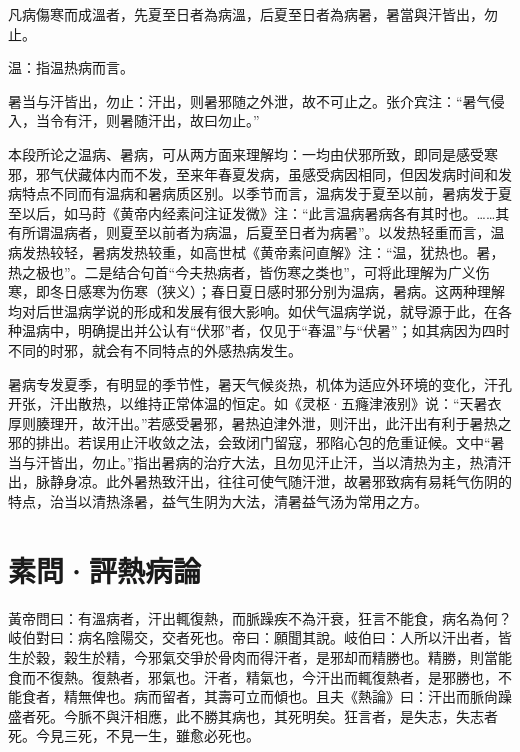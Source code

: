 \documentclass[draft,12pt]{ctexbook}
\begin{document}

\begin{yuanwen}
凡病傷寒而成溫者，先夏至日者為病溫，后夏至日者為病暑，暑當與汗皆出，勿止。
\end{yuanwen}


\begin{jiaozhu}
  \item 温：指温热病而言。
  \item 暑当与汗皆出，勿止：汗出，则暑邪随之外泄，故不可止之。张介宾注：“暑气侵入，当令有汗，则暑随汗出，故曰勿止。”
\end{jiaozhu}


本段所论之温病、暑病，可从两方面来理解均：一均由伏邪所致，即同是感受寒邪，邪气伏藏体内而不发，至来年春夏发病，虽感受病因相同，但因发病时间和发病特点不同而有温病和暑病质区别。以季节而言，温病发于夏至以前，暑病发于夏至以后，如马莳《黄帝内经素问注证发微》注：“此言温病暑病各有其时也。……其有所谓温病者，则夏至以前者为病温，后夏至日者为病暑”。以发热轻重而言，温病发热较轻，暑病发热较重，如高世栻《黄帝素问直解》注：“温，犹热也。暑，热之极也”。二是结合句首“今夫热病者，皆伤寒之类也”，可将此理解为广义伤寒，即冬日感寒为伤寒（狭义）；春日夏日感时邪分别为温病，暑病。这两种理解均对后世温病学说的形成和发展有很大影响。如伏气温病学说，就导源于此，在各种温病中，明确提出并公认有“伏邪”者，仅见于“春温”与“伏暑”；如其病因为四时不同的时邪，就会有不同特点的外感热病发生。



暑病专发夏季，有明显的季节性，暑天气候炎热，机体为适应外环境的变化，汗孔开张，汗出散热，以维持正常体温的恒定。如《灵枢·五癃津液别》说：“天暑衣厚则腠理开，故汗出。”若感受暑邪，暑热迫津外泄，则汗出，此汗出有利于暑热之邪的排出。若误用止汗收敛之法，会致闭门留寇，邪陷心包的危重证候。文中“暑当与汗皆出，勿止。”指出暑病的治疗大法，且勿见汗止汗，当以清热为主，热清汗出，脉静身凉。此外暑热致汗出，往往可使气随汗泄，故暑邪致病有易耗气伤阴的特点，治当以清热涤暑，益气生阴为大法，清暑益气汤为常用之方。

\section{素問·評熱病論}%


\begin{yuanwen}
黃帝問曰：有溫病者，汗出輒復熱，而脈躁疾不為汗衰，狂言不能食，病名為何？岐伯對曰：病名陰陽交，交者死也。帝曰：願聞其說。岐伯曰：人所以汗出者，皆生於穀，榖生於精，今邪氣交爭於骨肉而得汗者，是邪却而精勝也。精勝，則當能食而不復熱。復熱者，邪氣也。汗者，精氣也，今汗出而輒復熱者，是邪勝也，不能食者，精無俾也。病而留者，其壽可立而傾也。且夫《熱論》曰：汗出而脈尙躁盛者死。今脈不與汗相應，此不勝其病也，其死明矣。狂言者，是失志，失志者死。今見三死，不見一生，雖愈必死也。
\end{yuanwen}
\end{document}
